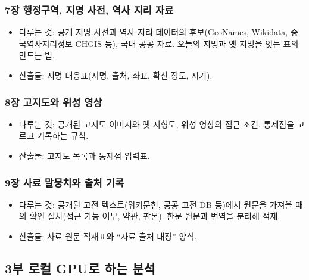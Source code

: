 \hypertarget{uxc7a5-uxd589uxc815uxad6cuxc5ed-uxc9c0uxba85-uxc0acuxc804-uxc5eduxc0ac-uxc9c0uxb9ac-uxc790uxb8cc}{%
\subsubsection{7장 행정구역, 지명 사전, 역사 지리 자료}\label{uxc7a5-uxd589uxc815uxad6cuxc5ed-uxc9c0uxba85-uxc0acuxc804-uxc5eduxc0ac-uxc9c0uxb9ac-uxc790uxb8cc}}

\begin{itemize}
\tightlist
\item
  다루는 것: 공개 지명 사전과 역사 지리 데이터의 후보(GeoNames, Wikidata, 중국역사지리정보 CHGIS 등), 국내 공공 자료. 오늘의 지명과 옛 지명을 잇는 표의 만드는 법.
\item
  산출물: 지명 대응표(지명, 출처, 좌표, 확신 정도, 시기).
\end{itemize}

\hypertarget{uxc7a5-uxace0uxc9c0uxb3c4uxc640-uxc704uxc131-uxc601uxc0c1}{%
\subsubsection{8장 고지도와 위성 영상}\label{uxc7a5-uxace0uxc9c0uxb3c4uxc640-uxc704uxc131-uxc601uxc0c1}}

\begin{itemize}
\tightlist
\item
  다루는 것: 공개된 고지도 이미지와 옛 지형도, 위성 영상의 접근 조건. 통제점을 고르고 기록하는 규칙.
\item
  산출물: 고지도 목록과 통제점 입력표.
\end{itemize}

\hypertarget{uxc7a5-uxc0acuxb8cc-uxb9d0uxbb49uxce58uxc640-uxcd9cuxcc98-uxae30uxb85d}{%
\subsubsection{9장 사료 말뭉치와 출처 기록}\label{uxc7a5-uxc0acuxb8cc-uxb9d0uxbb49uxce58uxc640-uxcd9cuxcc98-uxae30uxb85d}}

\begin{itemize}
\tightlist
\item
  다루는 것: 공개된 고전 텍스트(위키문헌, 공공 고전 DB 등)에서 원문을 가져올 때의 확인 절차(접근 가능 여부, 약관, 판본). 한문 원문과 번역을 분리해 적재.
\item
  산출물: 사료 원문 적재표와 ``자료 출처 대장'' 양식.
\end{itemize}

\hypertarget{uxbd80-uxb85cuxceec-gpuuxb85c-uxd558uxb294-uxbd84uxc11d}{%
\subsection{3부 로컬 GPU로 하는 분석}\label{uxbd80-uxb85cuxceec-gpuuxb85c-uxd558uxb294-uxbd84uxc11d}}

